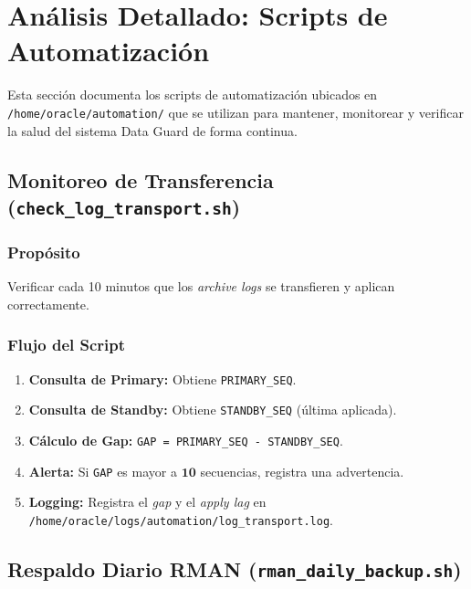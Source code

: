 \documentclass[11pt, a4paper]{report}
\begin{document}
\newpage

\chapter[Apéndice C: Scripts Automatización]{Análisis Detallado: Scripts de Automatización}

Esta sección documenta los scripts de automatización ubicados en \texttt{/home/oracle/automation/} que se utilizan para mantener, monitorear y verificar la salud del sistema Data Guard de forma continua.
\section{Monitoreo de Transferencia (\texttt{check\_log\_transport.sh})}

\subsection{Propósito}
Verificar cada 10 minutos que los \textit{archive logs} se transfieren y aplican correctamente.
\subsection{Flujo del Script}
\begin{enumerate}
    \item \textbf{Consulta de Primary:} Obtiene \texttt{PRIMARY\_SEQ}.
    \item \textbf{Consulta de Standby:} Obtiene \texttt{STANDBY\_SEQ} (última aplicada).
\item \textbf{Cálculo de Gap:} \texttt{GAP = PRIMARY\_SEQ - STANDBY\_SEQ}.
    \item \textbf{Alerta:} Si \texttt{GAP} es mayor a $\mathbf{10}$ secuencias, registra una advertencia.
\item \textbf{Logging:} Registra el \textit{gap} y el \textit{apply lag} en \texttt{/home/oracle/logs/automation/log\_transport.log}.
\end{enumerate}

\section{Respaldo Diario RMAN (\texttt{rman\_daily\_backup.sh})}
\end{document}
